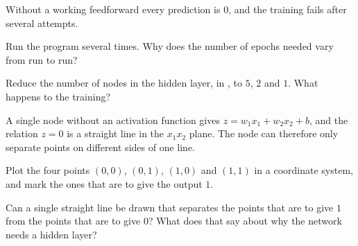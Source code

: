 \begin{aside}
\note[Note] Without a working feedforward every prediction is $0$, and the training fails after
several attempts.
\end{aside}

\begin{parts}
  \item Run the program several times. Why does the number of epochs needed vary from run to run?
  \item Reduce the number of nodes in the hidden layer,  in , to
    $5$, $2$ and $1$. What happens to the training?
\end{parts}

A single node without an activation function gives $z = w_1 x_1 + w_2 x_2 + b$, and the relation
$z = 0$ is a straight line in the $x_1 x_2$ plane. The node can therefore only separate points on
different sides of one line.
\begin{parts}
  \item Plot the four points $(0, 0)$, $(0, 1)$, $(1, 0)$ and $(1, 1)$ in a coordinate system,
    and mark the ones that are to give the output $1$.
  \item Can a single straight line be drawn that separates the points that are to give $1$ from
    the points that are to give $0$? What does that say about why the network needs a hidden
    layer?
\end{parts}
